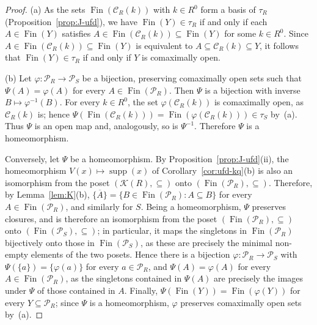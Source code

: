 \documentclass[12pt,reqno,a4paper]{amsart}
\newcommand{\Pe}{\mathcal{P}}
\newcommand{\K}{\mathcal{K}}
\newcommand{\clo}[1]{\overline{\{#1\}}}
\DeclareMathOperator{\Fin}{Fin}
\DeclareMathOperator{\supp}{supp}
\theoremstyle{plain}
\theoremstyle{definition}
\begin{document}
\begin{proof}
(a) As the sets $\Fin(\mathcal{C}_R(k))$ with $k\in R^0$ form a basis of $\tau_R$ (Proposition~\ref{prop:J-ufd}), we have $\Fin(Y)\in\tau_R$ if and only if each $A\in\Fin(Y)$ satisfies $A\in\Fin(\mathcal{C}_R(k))\subseteq\Fin(Y)$ for some $k\in R^0$. Since $A\in\Fin(\mathcal{C}_R(k))\subseteq\Fin(Y)$ is equivalent to $A\subseteq\mathcal{C}_R(k)\subseteq Y$, it follows that $\Fin(Y)\in\tau_R$ if and only if $Y$ is comaximally open.

(b) Let $\varphi\colon\Pe_R\to\Pe_S$ be a bijection, preserving comaximally open sets such that $\Psi(A)=\varphi(A)$ for every $A\in\Fin(\Pe_R)$. Then $\Psi$ is a bijection with inverse $B\mapsto\varphi^{-1}(B)$. For every $k\in R^0$, the set $\varphi(\mathcal{C}_R(k))$ is comaximally open, as $\mathcal{C}_R(k)$ is; hence $\Psi(\Fin(\mathcal{C}_R(k)))=\Fin(\varphi(\mathcal{C}_R(k)))\in\tau_S$ by~(a). Thus $\Psi$ is an open map and, analogously, so is $\Psi^{-1}$. Therefore $\Psi$ is a homeomorphism.

Conversely, let $\Psi$ be a homeomorphism. By Proposition~\ref{prop:J-ufd}(ii), the homeomorphism $V(x)\mapsto\supp(x)$ of Corollary~\ref{cor:ufd-kq}(b) is also an isomorphism from the poset $(\K(R),\subseteq)$ onto $(\Fin(\Pe_R),\subseteq)$. Therefore, by Lemma~\ref{lem:K}(b), $\clo{A}=\{B\in\Fin(\Pe_R):A\subseteq B\}$ for every $A\in\Fin(\Pe_R)$, and similarly for $S$. Being a homeomorphism, $\Psi$ preserves closures, and is therefore an isomorphism from the poset $(\Fin(\Pe_R),\subseteq)$ onto $(\Fin(\Pe_S),\subseteq)$; in particular, it maps the singletons in $\Fin(\Pe_R)$ bijectively onto those in $\Fin(\Pe_S)$, as these are precisely the minimal non-empty elements of the two posets. Hence there is a bijection $\varphi\colon\Pe_R\to\Pe_S$ with $\Psi(\{a\})=\{\varphi(a)\}$ for every $a\in\Pe_R$, and $\Psi(A)=\varphi(A)$ for every $A\in\Fin(\Pe_R)$, as the singletons contained in $\Psi(A)$ are precisely the images under $\Psi$ of those contained in $A$. Finally, $\Psi(\Fin(Y))=\Fin(\varphi(Y))$ for every $Y\subseteq\Pe_R$; since $\Psi$ is a homeomorphism, $\varphi$ preserves comaximally open sets by~(a).
\end{proof}
\end{document}
